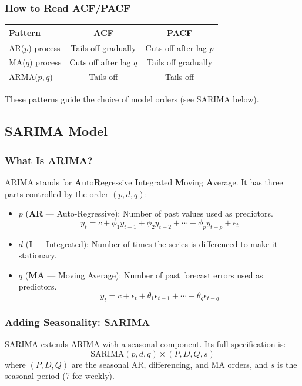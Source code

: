 \documentclass[12pt, a4paper]{article}
\begin{document}
\subsubsection{How to Read ACF/PACF}
\begin{center}
\begin{tabular}{lcc}
    \toprule
    \textbf{Pattern} & \textbf{ACF} & \textbf{PACF} \\
    \midrule
    AR($p$) process  & Tails off gradually & Cuts off after lag $p$ \\
    MA($q$) process  & Cuts off after lag $q$ & Tails off gradually \\
    ARMA($p,q$)      & Tails off & Tails off \\
    \bottomrule
\end{tabular}
\end{center}

These patterns guide the choice of model orders (see SARIMA below).

\subsection{SARIMA Model}

\subsubsection{What Is ARIMA?}
ARIMA stands for \textbf{A}uto\textbf{R}egressive \textbf{I}ntegrated
\textbf{M}oving \textbf{A}verage. It has three parts controlled by the order
$(p, d, q)$:

\begin{itemize}
    \item $p$ (\textbf{AR} — Auto-Regressive): Number of past values used as
          predictors.
          \[
              y_t = c + \phi_1 y_{t-1} + \phi_2 y_{t-2} + \cdots +
              \phi_p y_{t-p} + \epsilon_t
          \]
    \item $d$ (\textbf{I} — Integrated): Number of times the series is
          differenced to make it stationary.
    \item $q$ (\textbf{MA} — Moving Average): Number of past forecast errors
          used as predictors.
          \[
              y_t = c + \epsilon_t + \theta_1 \epsilon_{t-1} + \cdots +
              \theta_q \epsilon_{t-q}
          \]
\end{itemize}

\subsubsection{Adding Seasonality: SARIMA}
SARIMA extends ARIMA with a seasonal component. Its full specification is:
\[
    \text{SARIMA}(p, d, q) \times (P, D, Q, s)
\]
where $(P, D, Q)$ are the seasonal AR, differencing, and MA orders, and $s$
is the seasonal period (7 for weekly).
\end{document}
